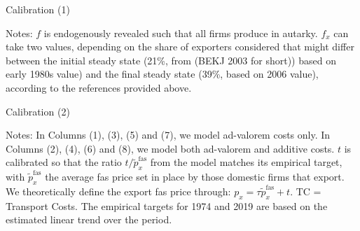 \documentclass[a4paper,11pt]{article}
\begin{document}
\begin{table}[htb]
  \centering
  \caption{Calibration (1)} \label{tab:calib_horsTC}
\begin{center}
	
\end{center}
{\parbox[l]{14cm}{ \vspace{2pt}\footnotesize{Notes: $f$ is endogenously revealed such that all firms produce in autarky. $f_x$ can take two values, depending on the share of exporters considered that might differ between the initial steady state (21\%, from \cite{BEJK-AER-03} (BEKJ 2003 for short)) based on early 1980s value) and the final steady state (39\%, based on 2006 value), according to the references provided above. }}}
\end{table}


\begin{table}[htb]
  \centering
  \caption{Calibration (2)}\label{tab:calib_TC}
\begin{center}
	
\end{center}
{\parbox[l]{14cm}{ \vspace{4pt}\footnotesize{Notes: In Columns (1), (3), (5) and (7), we model ad-valorem costs only. In Columns (2), (4), (6) and (8), we model both ad-valorem and additive costs. $t$ is calibrated so that the ratio $t/\widetilde{p}^{\text{fas}}_x$ from the model matches its empirical target, with $\widetilde{p}^{\text{fas}}_x$ the average fas price set in place by those domestic firms that export. We theoretically define the export fas price through: $p_x = \tau \widetilde{p}_x^{\text{fas}} +t$. TC = Transport Costs. The empirical targets for 1974 and 2019 are based on the estimated linear trend over the period.}}}
\end{table}
\end{document}
